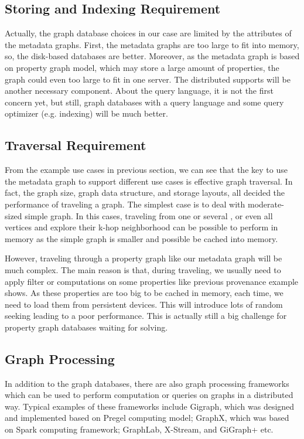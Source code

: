 \subsection{Storing and Indexing Requirement}

Actually, the graph database choices in our case are limited by the attributes of the metadata graphs. First, the metadata graphs are too large to fit into memory, so, the disk-based databases are better. Moreover, as the metadata graph is based on property graph model, which may store a large amount of properties, the graph could even too large to fit in one server. The distributed supports will be another necessary component. About the query language, it is not the first concern yet, but still, graph databases with a query language and some query optimizer (e.g. indexing) will be much better.  

\subsection{Traversal Requirement}

From the example use cases in previous section, we can see that the key to use the metadata graph to support different use cases is effective graph traversal. In fact, the graph size, graph data structure, and storage layouts, all decided the performance of traveling a graph. The simplest case is to deal with moderate-sized simple graph. In this cases, traveling from one or several , or even all vertices and explore their k-hop neighborhood can be possible to perform in memory as the simple graph is smaller and possible be cached into memory. 

However, traveling through a property graph like our metadata graph will be much complex. The main reason is that, during traveling, we usually need to apply filter or computations on some properties like previous provenance example shows. As these properties are too big to be cached in memory, each time, we need to load them from persistent devices. This will introduce lots of random seeking  leading to a poor performance. This is actually still a big challenge for property graph databases waiting for solving.

\subsection{Graph Processing}

In addition to the graph databases, there are also graph processing frameworks which can be used to perform computation or queries on graphs in a distributed way. Typical examples of these frameworks include Gigraph, which was designed and implemented based on Pregel computing model; GraphX, which was based on Spark computing framework; GraphLab, X-Stream, and GiGraph+ etc. 

